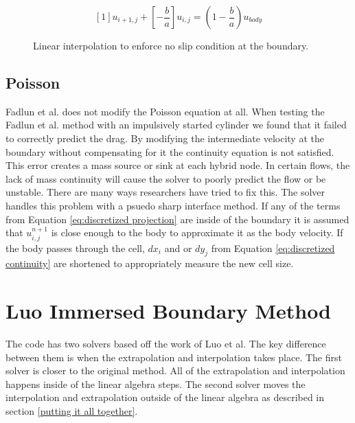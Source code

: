 \documentclass[onehalf,11pt]{beavtex}
\begin{document}
\begin{equation}
\left[1\right]u_{i+1,j} + \left[-\frac{b}{a}\right]u_{i,j} = \left(1-\frac{b}{a}\right)u_{body}
\label{eq:ID intermediate velocity interpolation}
\end{equation}

\begin{figure}[htb]
	\centering
	
	\caption{Linear interpolation to enforce no slip condition at the boundary.}
	\label{fig:ID linear interpolation}
\end{figure}

\subsection{Poisson}
Fadlun et al. does not modify the Poisson equation at all.
When testing the Fadlun et al. method with an impulsively started cylinder we found that it failed to correctly predict the drag.
By modifying the intermediate velocity at the boundary without compensating for it the continuity equation is not satisfied.
This error creates a mass source or sink at each hybrid node. 
In certain flows, the lack of mass continuity will cause the solver to poorly predict the flow or be unstable.
There are many ways researchers have tried to fix this.
The solver handles this problem with a psuedo sharp interface method. 
If any of the terms from Equation \eqref{eq:discretized projection} are inside of the boundary it is assumed that $u_{i,j}^{n+1}$ is close enough to the body to approximate it as the body velocity.
If the body passes through the cell, $dx_i$ and or $dy_j$ from Equation \eqref{eq:discretized continuity} are shortened to appropriately measure the new cell size.

\section{Luo Immersed Boundary Method}
The code has two solvers based off the work of Luo et al. 
The key difference between them is when the extrapolation and interpolation takes place. 
The first solver is closer to the original method. 
All of the extrapolation and interpolation happens inside of the linear algebra steps. 
The second solver moves the interpolation and extrapolation outside of the linear algebra as described in section \ref{putting it all together}.
\end{document}
